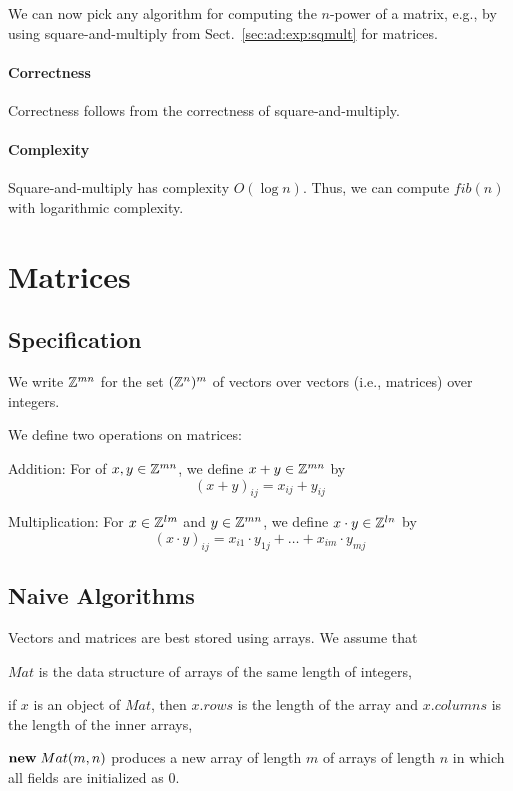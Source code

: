 We can now pick any algorithm for computing the $n$-power of a matrix, e.g., by using square-and-multiply from Sect.~\ref{sec:ad:exp:sqmult} for matrices.

\paragraph{Correctness}
Correctness follows from the correctness of square-and-multiply.

\paragraph{Complexity}
Square-and-multiply has complexity $O(\log n)$.
Thus, we can compute $fib(n)$ with logarithmic complexity.



\section{Matrices}\label{sec:ad:matrix}

\subsection{Specification}

We write $\mathbb{Z}^{mn}$ for the set $(\mathbb{Z}^n)^m$ of vectors over vectors (i.e., matrices) over integers.

We define two operations on matrices:
\begin{compactitem}
\item Addition: For of $x,y\in \mathbb{Z}^{mn}$, we define $x+y\in\mathbb{Z}^{mn}$ by
\[(x+y)_{ij}=x_{ij}+y_{ij}\]

\item Multiplication: For $x\in \mathbb{Z}^{lm}$ and $y\in \mathbb{Z}^{mn}$, we define $x\cdot y\in\mathbb{Z}^{ln}$ by
\[(x\cdot y)_{ij}=x_{i1}\cdot y_{1j} +\ldots +x_{im}\cdot y_{mj}\]
\end{compactitem}


\subsection{Naive Algorithms}

Vectors and matrices are best stored using arrays.
We assume that
\begin{compactitem}
 \item $Mat$ is the data structure of arrays of the same length of integers,
 \item if $x$ is an object of $Mat$, then $x.rows$ is the length of the array and $x.columns$ is the length of the inner arrays,
 \item ${\rm \bf new}\; Mat(m,n)$ produces a new array of length $m$ of arrays of length $n$ in which all fields are initialized as $0$.
\end{compactitem}

